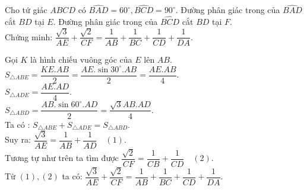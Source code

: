 \begin{ex}%
Cho tứ giác $ABCD$ có $\widehat{BAD}=60^\circ, \widehat{BCD}=90^\circ$. Đường phân giác trong của $\widehat{BAD}$ cắt $BD$ tại $E$. Đường phân giác trong của $\widehat{BCD}$ cắt $BD$ tại $F$.\\
Chứng minh: $\dfrac{\sqrt{3}}{AE}+\dfrac{\sqrt{2}}{CF}=\dfrac{1}{AB}+\dfrac{1}{BC}+\dfrac{1}{CD}+\dfrac{1}{DA}$.
\loigiai
    {
    \begin{center}
    
    \end{center}
    Gọi $K$ là hình chiếu vuông góc của $E$ lên $AB$.\\
$S_{\triangle ABE}=\dfrac{KE.AB}{2}=\dfrac{AE.\sin 30^\circ .AB}{2}=\dfrac{AE.AB}{4}$.\\
$S_{\triangle ADE}=\dfrac{AE.AD}{4}$.\\
$S_{\triangle ABD}=\dfrac{AB.\sin 60^\circ .AD}{2}=\dfrac{\sqrt{3}AB.AD}{4}$.\\
Ta có : $S_{\triangle ABE} + S_{\triangle ADE} = S_{\triangle ABD}$.\\
Suy ra: $\dfrac{\sqrt{3}}{AE}=\dfrac{1}{AB}+\dfrac{1}{AD} \quad (1)$.\\
Tương tự như trên ta tìm được $\dfrac{\sqrt{2}}{CF}=\dfrac{1}{CB}+\dfrac{1}{CD} \quad (2)$.\\
Từ $(1), (2)$ ta có: $\dfrac{\sqrt{3}}{AE}+\dfrac{\sqrt{2}}{CF}=\dfrac{1}{AB}+\dfrac{1}{BC}+\dfrac{1}{CD}+\dfrac{1}{DA}$.
    }
\end{ex}


